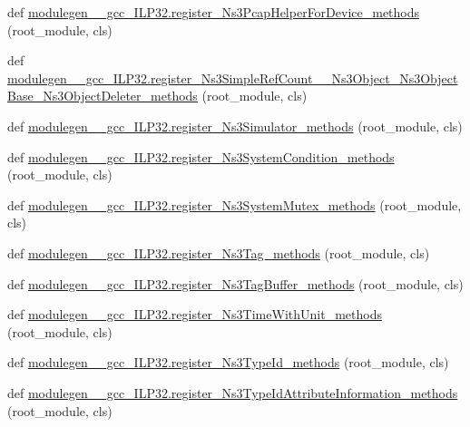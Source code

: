 \begin{DoxyCompactItemize}
\item 
def \hyperlink{namespacemodulegen____gcc__ILP32_ab4a403fafcdf0b5d47126dcf02ee269f}{modulegen\+\_\+\+\_\+gcc\+\_\+\+I\+L\+P32.\+register\+\_\+\+Ns3\+Pcap\+Helper\+For\+Device\+\_\+methods} (root\+\_\+module, cls)
\item 
def \hyperlink{namespacemodulegen____gcc__ILP32_ac5f5e4798fdbd14c15d133fdd259a2e0}{modulegen\+\_\+\+\_\+gcc\+\_\+\+I\+L\+P32.\+register\+\_\+\+Ns3\+Simple\+Ref\+Count\+\_\+\+\_\+\+Ns3\+Object\+\_\+\+Ns3\+Object\+Base\+\_\+\+Ns3\+Object\+Deleter\+\_\+methods} (root\+\_\+module, cls)
\item 
def \hyperlink{namespacemodulegen____gcc__ILP32_aa549fc85b0feec2f8115e70db4c26c2a}{modulegen\+\_\+\+\_\+gcc\+\_\+\+I\+L\+P32.\+register\+\_\+\+Ns3\+Simulator\+\_\+methods} (root\+\_\+module, cls)
\item 
def \hyperlink{namespacemodulegen____gcc__ILP32_a36b087c80d4c9817c6f58b3434387b30}{modulegen\+\_\+\+\_\+gcc\+\_\+\+I\+L\+P32.\+register\+\_\+\+Ns3\+System\+Condition\+\_\+methods} (root\+\_\+module, cls)
\item 
def \hyperlink{namespacemodulegen____gcc__ILP32_a12bb09ece68f1703c280833eacbbbcb5}{modulegen\+\_\+\+\_\+gcc\+\_\+\+I\+L\+P32.\+register\+\_\+\+Ns3\+System\+Mutex\+\_\+methods} (root\+\_\+module, cls)
\item 
def \hyperlink{namespacemodulegen____gcc__ILP32_a5578ddbed750d0c575df9ed36c4d86d6}{modulegen\+\_\+\+\_\+gcc\+\_\+\+I\+L\+P32.\+register\+\_\+\+Ns3\+Tag\+\_\+methods} (root\+\_\+module, cls)
\item 
def \hyperlink{namespacemodulegen____gcc__ILP32_a24ac4bbf908e2dfdea2eca022c057906}{modulegen\+\_\+\+\_\+gcc\+\_\+\+I\+L\+P32.\+register\+\_\+\+Ns3\+Tag\+Buffer\+\_\+methods} (root\+\_\+module, cls)
\item 
def \hyperlink{namespacemodulegen____gcc__ILP32_a8942fb893268c4774333e3a81c3cf7d3}{modulegen\+\_\+\+\_\+gcc\+\_\+\+I\+L\+P32.\+register\+\_\+\+Ns3\+Time\+With\+Unit\+\_\+methods} (root\+\_\+module, cls)
\item 
def \hyperlink{namespacemodulegen____gcc__ILP32_a6436195ea7813af4a6f5611bac15066d}{modulegen\+\_\+\+\_\+gcc\+\_\+\+I\+L\+P32.\+register\+\_\+\+Ns3\+Type\+Id\+\_\+methods} (root\+\_\+module, cls)
\item 
def \hyperlink{namespacemodulegen____gcc__ILP32_afa4c5c57202d38b0cdfa0d7fd58b5797}{modulegen\+\_\+\+\_\+gcc\+\_\+\+I\+L\+P32.\+register\+\_\+\+Ns3\+Type\+Id\+Attribute\+Information\+\_\+methods} (root\+\_\+module, cls)
\item 

\end{DoxyCompactItemize}
